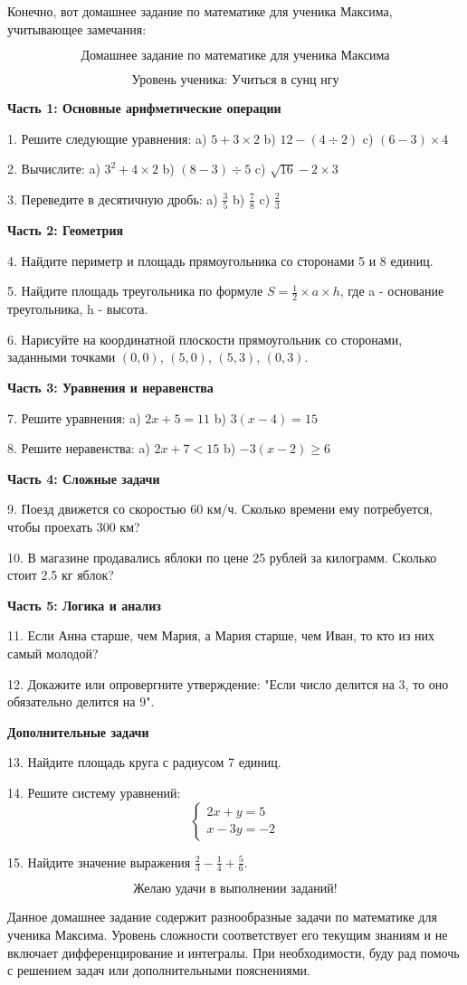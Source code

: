 \documentclass{article}
\begin{document}
Конечно, вот домашнее задание по математике для ученика Максима, учитывающее замечания:

\[
\text{Домашнее задание по математике для ученика Максима}
\]

\[
\text{Уровень ученика: Учиться в сунц нгу}
\]

\textbf{Часть 1: Основные арифметические операции}

1. Решите следующие уравнения:
   a) \(5 + 3 \times 2\)
   b) \(12 - (4 \div 2)\)
   c) \((6 - 3) \times 4\)

2. Вычислите:
   a) \(3^2 + 4 \times 2\)
   b) \((8 - 3) \div 5\)
   c) \(\sqrt{16} - 2 \times 3\)

3. Переведите в десятичную дробь:
   a) \( \frac{3}{5} \)
   b) \( \frac{7}{8} \)
   c) \( \frac{2}{3} \)

\textbf{Часть 2: Геометрия}

4. Найдите периметр и площадь прямоугольника со сторонами 5 и 8 единиц.

5. Найдите площадь треугольника по формуле \(S = \frac{1}{2} \times a \times h\), где a - основание треугольника, h - высота.

6. Нарисуйте на координатной плоскости прямоугольник со сторонами, заданными точками \((0,0)\), \((5,0)\), \((5,3)\), \((0,3)\).

\textbf{Часть 3: Уравнения и неравенства}

7. Решите уравнения:
   a) \(2x + 5 = 11\)
   b) \(3(x - 4) = 15\)

8. Решите неравенства:
   a) \(2x + 7 < 15\)
   b) \(-3(x - 2) \geq 6\)

\textbf{Часть 4: Сложные задачи}

9. Поезд движется со скоростью 60 км/ч. Сколько времени ему потребуется, чтобы проехать 300 км?

10. В магазине продавались яблоки по цене 25 рублей за килограмм. Сколько стоит 2.5 кг яблок?

\textbf{Часть 5: Логика и анализ}

11. Если Анна старше, чем Мария, а Мария старше, чем Иван, то кто из них самый молодой?

12. Докажите или опровергните утверждение: "Если число делится на 3, то оно обязательно делится на 9".

\textbf{Дополнительные задачи}

13. Найдите площадь круга с радиусом 7 единиц.

14. Решите систему уравнений:
\[
\begin{cases}
2x + y = 5 \\
x - 3y = -2
\end{cases}
\]

15. Найдите значение выражения \(\frac{2}{3} - \frac{1}{4} + \frac{5}{6}\).

\[
\text{Желаю удачи в выполнении заданий!}
\]

Данное домашнее задание содержит разнообразные задачи по математике для ученика Максима. Уровень сложности соответствует его текущим знаниям и не включает дифференцирование и интегралы. При необходимости, буду рад помочь с решением задач или дополнительными пояснениями.
\end{document}
